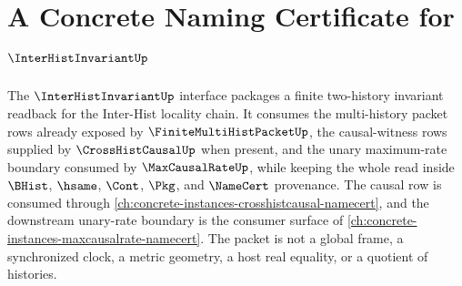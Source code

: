 \chapter{A Concrete Naming Certificate for $\InterHistInvariantUp$}
\label{ch:concrete-instances-interhistinvariant-namecert}

The $\InterHistInvariantUp$ interface packages a finite two-history invariant readback for the Inter-Hist locality chain. It consumes the multi-history packet rows already exposed by $\FiniteMultiHistPacketUp$, the causal-witness rows supplied by $\CrossHistCausalUp$ when present, and the unary maximum-rate boundary consumed by $\MaxCausalRateUp$, while keeping the whole read inside $\BHist$, $\hsame$, $\Cont$, $\Pkg$, and $\NameCert$ provenance. The causal row is consumed through \autoref{ch:concrete-instances-crosshistcausal-namecert}, and the downstream unary-rate boundary is the consumer surface of \autoref{ch:concrete-instances-maxcausalrate-namecert}. The packet is not a global frame, a synchronized clock, a metric geometry, a host real equality, or a quotient of histories.



